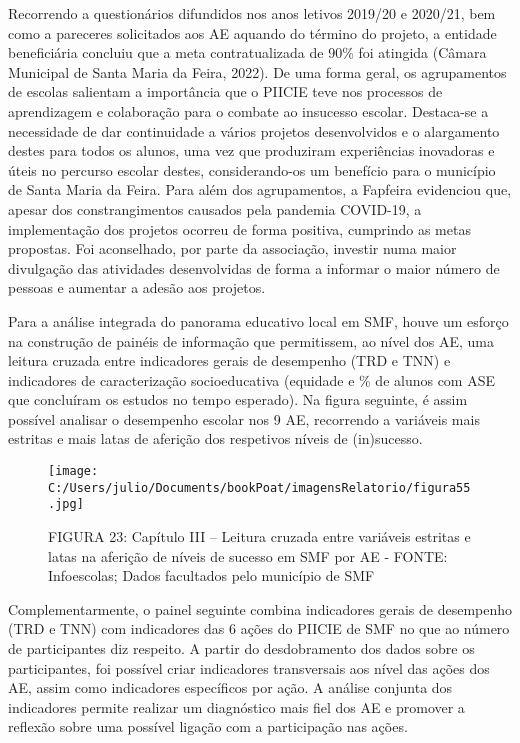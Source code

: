 \documentclass[
]{book}
\begin{document}
Recorrendo a questionários difundidos nos anos letivos 2019/20 e 2020/21, bem como a pareceres solicitados aos AE aquando do término do projeto, a entidade beneficiária concluiu que a meta contratualizada de 90\% foi atingida (Câmara Municipal de Santa Maria da Feira, 2022). De uma forma geral, os agrupamentos de escolas salientam a importância que o PIICIE teve nos processos de aprendizagem e colaboração para o combate ao insucesso escolar. Destaca-se a necessidade de dar continuidade a vários projetos desenvolvidos e o alargamento destes para todos os alunos, uma vez que produziram experiências inovadoras e úteis no percurso escolar destes, considerando-os um benefício para o município de Santa Maria da Feira. Para além dos agrupamentos, a Fapfeira evidenciou que, apesar dos constrangimentos causados pela pandemia COVID-19, a implementação dos projetos ocorreu de forma positiva, cumprindo as metas propostas. Foi aconselhado, por parte da associação, investir numa maior divulgação das atividades desenvolvidas de forma a informar o maior número de pessoas e aumentar a adesão aos projetos.

Para a análise integrada do panorama educativo local em SMF, houve um esforço na construção de painéis de informação que permitissem, ao nível dos AE, uma leitura cruzada entre indicadores gerais de desempenho (TRD e TNN) e indicadores de caracterização socioeducativa (equidade e \% de alunos com ASE que concluíram os estudos no tempo esperado). Na figura seguinte, é assim possível analisar o desempenho escolar nos 9 AE, recorrendo a variáveis mais estritas e mais latas de aferição dos respetivos níveis de (in)sucesso.

\begin{figure}
\centering
\texttt{[image: C:/Users/julio/Documents/bookPoat/imagensRelatorio/figura55.jpg]}
\caption{FIGURA 23: Capítulo III -- Leitura cruzada entre variáveis estritas e latas na aferição de níveis de sucesso em SMF por AE - FONTE: Infoescolas; Dados facultados pelo município de SMF}
\end{figure}

Complementarmente, o painel seguinte combina indicadores gerais de desempenho (TRD e TNN) com indicadores das 6 ações do PIICIE de SMF no que ao número de participantes diz respeito. A partir do desdobramento dos dados sobre os participantes, foi possível criar indicadores transversais aos nível das ações dos AE, assim como indicadores específicos por ação. A análise conjunta dos indicadores permite realizar um diagnóstico mais fiel dos AE e promover a reflexão sobre uma possível ligação com a participação nas ações.
\end{document}

